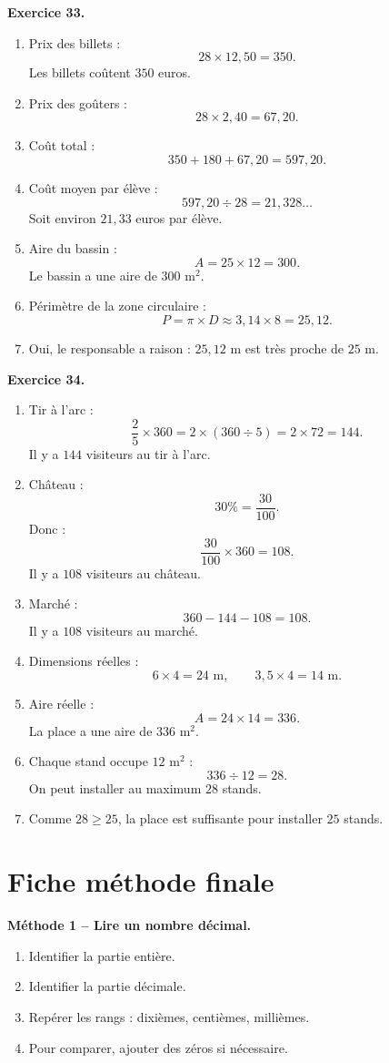 \documentclass[11pt,a4paper]{article}
\newcommand{\corrige}[2]{
\begin{corrigebox}
\textbf{Exercice #1.}

#2
\end{corrigebox}
}
\begin{document}
\corrige{33}{
\begin{enumerate}[label=\arabic*)]
\item Prix des billets :
\[
28\times 12,50=350.
\]
Les billets coûtent $350$ euros.
\item Prix des goûters :
\[
28\times 2,40=67,20.
\]
\item Coût total :
\[
350+180+67,20=597,20.
\]
\item Coût moyen par élève :
\[
597,20\div 28=21,328\ldots
\]
Soit environ $21,33$ euros par élève.
\item Aire du bassin :
\[
A=25\times 12=300.
\]
Le bassin a une aire de $300$ m$^2$.
\item Périmètre de la zone circulaire :
\[
P=\pi\times D\approx 3,14\times 8=25,12.
\]
\item Oui, le responsable a raison : $25,12$ m est très proche de $25$ m.
\end{enumerate}
}

\corrige{34}{
\begin{enumerate}[label=\arabic*)]
\item Tir à l'arc :
\[
\frac{2}{5}\times 360=2\times(360\div 5)=2\times 72=144.
\]
Il y a $144$ visiteurs au tir à l'arc.
\item Château :
\[
30\%=\frac{30}{100}.
\]
Donc :
\[
\frac{30}{100}\times 360=108.
\]
Il y a $108$ visiteurs au château.
\item Marché :
\[
360-144-108=108.
\]
Il y a $108$ visiteurs au marché.
\item Dimensions réelles :
\[
6\times 4=24\text{ m},
\qquad
3,5\times 4=14\text{ m}.
\]
\item Aire réelle :
\[
A=24\times 14=336.
\]
La place a une aire de $336$ m$^2$.
\item Chaque stand occupe $12$ m$^2$ :
\[
336\div 12=28.
\]
On peut installer au maximum $28$ stands.
\item Comme $28\geq 25$, la place est suffisante pour installer $25$ stands.
\end{enumerate}
}

\newpage

\section{Fiche méthode finale}

\begin{methodebox}
\textbf{Méthode 1 -- Lire un nombre décimal.}
\begin{enumerate}[label=\arabic*)]
\item Identifier la partie entière.
\item Identifier la partie décimale.
\item Repérer les rangs : dixièmes, centièmes, millièmes.
\item Pour comparer, ajouter des zéros si nécessaire.
\end{enumerate}
\end{methodebox}
\end{document}
